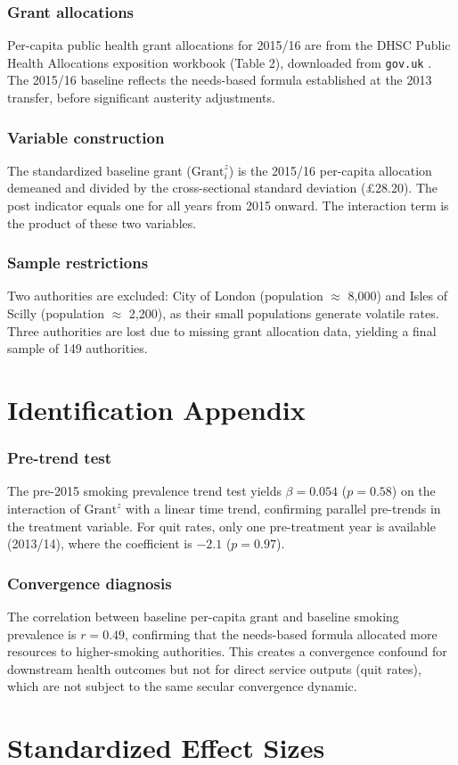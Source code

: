 \documentclass[12pt]{article}
\begin{document}
\subsubsection*{Grant allocations} Per-capita public health grant allocations for 2015/16 are from the DHSC Public Health Allocations exposition workbook (Table 2), downloaded from \texttt{gov.uk} \citep{dhsc2016allocations}. The 2015/16 baseline reflects the needs-based formula established at the 2013 transfer, before significant austerity adjustments.

\subsubsection*{Variable construction} The standardized baseline grant ($\text{Grant}^z_i$) is the 2015/16 per-capita allocation demeaned and divided by the cross-sectional standard deviation (\pounds28.20). The post indicator equals one for all years from 2015 onward. The interaction term is the product of these two variables.

\subsubsection*{Sample restrictions} Two authorities are excluded: City of London (population $\approx$ 8,000) and Isles of Scilly (population $\approx$ 2,200), as their small populations generate volatile rates. Three authorities are lost due to missing grant allocation data, yielding a final sample of 149 authorities.

\section{Identification Appendix}

\subsubsection*{Pre-trend test} The pre-2015 smoking prevalence trend test yields $\beta = 0.054$ ($p = 0.58$) on the interaction of $\text{Grant}^z$ with a linear time trend, confirming parallel pre-trends in the treatment variable. For quit rates, only one pre-treatment year is available (2013/14), where the coefficient is $-2.1$ ($p = 0.97$).

\subsubsection*{Convergence diagnosis} The correlation between baseline per-capita grant and baseline smoking prevalence is $r = 0.49$, confirming that the needs-based formula allocated more resources to higher-smoking authorities. This creates a convergence confound for downstream health outcomes but not for direct service outputs (quit rates), which are not subject to the same secular convergence dynamic.

\section{Standardized Effect Sizes}
\label{sec:sde}


\end{document}
